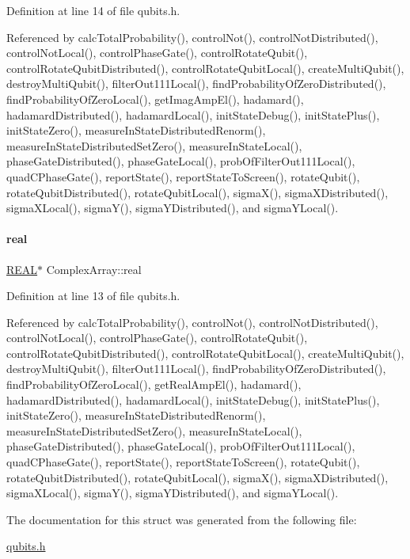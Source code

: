 Definition at line 14 of file qubits.\+h.



Referenced by calc\+Total\+Probability(), control\+Not(), control\+Not\+Distributed(), control\+Not\+Local(), control\+Phase\+Gate(), control\+Rotate\+Qubit(), control\+Rotate\+Qubit\+Distributed(), control\+Rotate\+Qubit\+Local(), create\+Multi\+Qubit(), destroy\+Multi\+Qubit(), filter\+Out111\+Local(), find\+Probability\+Of\+Zero\+Distributed(), find\+Probability\+Of\+Zero\+Local(), get\+Imag\+Amp\+El(), hadamard(), hadamard\+Distributed(), hadamard\+Local(), init\+State\+Debug(), init\+State\+Plus(), init\+State\+Zero(), measure\+In\+State\+Distributed\+Renorm(), measure\+In\+State\+Distributed\+Set\+Zero(), measure\+In\+State\+Local(), phase\+Gate\+Distributed(), phase\+Gate\+Local(), prob\+Of\+Filter\+Out111\+Local(), quad\+C\+Phase\+Gate(), report\+State(), report\+State\+To\+Screen(), rotate\+Qubit(), rotate\+Qubit\+Distributed(), rotate\+Qubit\+Local(), sigma\+X(), sigma\+X\+Distributed(), sigma\+X\+Local(), sigma\+Y(), sigma\+Y\+Distributed(), and sigma\+Y\+Local().

\mbox{\label{structComplexArray_a4195cac6c784ea1b6271f1c7dba1548a}} 
\paragraph{\texorpdfstring{real}{real}}
{\footnotesize\ttfamily \hyperlink{precision_8h_a4b654506f18b8bfd61ad2a29a7e38c25}{R\+E\+AL}$\ast$ Complex\+Array\+::real}



Definition at line 13 of file qubits.\+h.



Referenced by calc\+Total\+Probability(), control\+Not(), control\+Not\+Distributed(), control\+Not\+Local(), control\+Phase\+Gate(), control\+Rotate\+Qubit(), control\+Rotate\+Qubit\+Distributed(), control\+Rotate\+Qubit\+Local(), create\+Multi\+Qubit(), destroy\+Multi\+Qubit(), filter\+Out111\+Local(), find\+Probability\+Of\+Zero\+Distributed(), find\+Probability\+Of\+Zero\+Local(), get\+Real\+Amp\+El(), hadamard(), hadamard\+Distributed(), hadamard\+Local(), init\+State\+Debug(), init\+State\+Plus(), init\+State\+Zero(), measure\+In\+State\+Distributed\+Renorm(), measure\+In\+State\+Distributed\+Set\+Zero(), measure\+In\+State\+Local(), phase\+Gate\+Distributed(), phase\+Gate\+Local(), prob\+Of\+Filter\+Out111\+Local(), quad\+C\+Phase\+Gate(), report\+State(), report\+State\+To\+Screen(), rotate\+Qubit(), rotate\+Qubit\+Distributed(), rotate\+Qubit\+Local(), sigma\+X(), sigma\+X\+Distributed(), sigma\+X\+Local(), sigma\+Y(), sigma\+Y\+Distributed(), and sigma\+Y\+Local().



The documentation for this struct was generated from the following file\+:\begin{DoxyCompactItemize}
\item 
\hyperlink{qubits_8h}{qubits.\+h}\end{DoxyCompactItemize}
